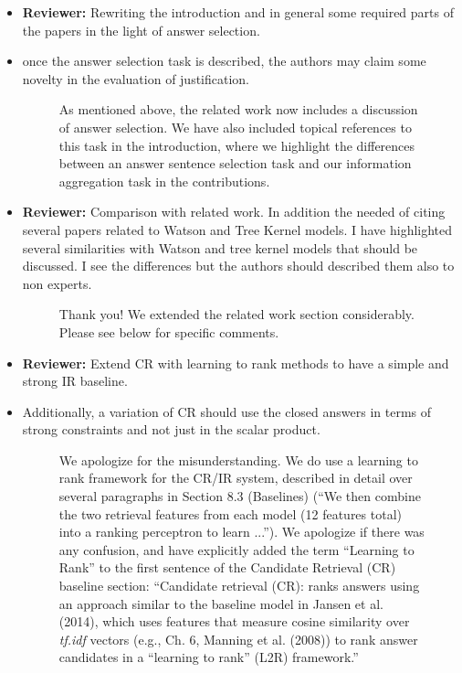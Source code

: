 \documentclass[10pt]{article}
\newcommand{\todo}[1]{\textcolor{red}{TODO: #1}}
\begin{document}
\begin{itemize}
\item \textbf{Reviewer:} Rewriting the introduction and in general some required parts of the
papers in the light of answer selection.
\item once the answer selection task is described, the authors may claim some
novelty in the evaluation of justification.


\begin{figure}[H]
\caption{ As mentioned above, the related work now includes a discussion of answer selection.  We have also included topical references to this task in the introduction, where we highlight the differences between an answer sentence selection task and our information aggregation task in the contributions. }
\end{figure}


\item \textbf{Reviewer:} Comparison with related work. In addition the needed of citing several
papers related to Watson and Tree Kernel models.
I have highlighted several similarities with Watson and tree kernel models
that should be discussed.
I see the differences but the authors should described them also to non
experts.

\begin{figure}[H]
\caption{ Thank you! We extended the related work section considerably. Please see below for specific comments.}
\end{figure}

\item \textbf{Reviewer:} Extend CR with learning to rank methods to have a simple and strong IR
baseline.

\item Additionally, a variation of CR should use the closed answers in terms of
strong constraints and not just in the scalar product.


\begin{figure}[H]
\caption{ We apologize for the misunderstanding. We do use a learning to rank framework for the CR/IR system, described in detail over several paragraphs in Section 8.3 (Baselines) (``We then combine the two retrieval features from each model (12 features total) into a ranking perceptron to learn ...''). We apologize if there was any confusion, and have explicitly added the term ``Learning to Rank'' to the first sentence of the Candidate Retrieval (CR) baseline section: 
``Candidate retrieval (CR): ranks answers using an approach similar to the baseline model in Jansen et al. (2014), which uses features that measure cosine similarity over {\em tf.idf} vectors (e.g., Ch. 6, Manning et al. (2008)) to rank answer candidates in a ``learning to rank'' (L2R) framework.''  }
\label{resp:learntorank}
\end{figure}



\end{itemize}
\end{document}
